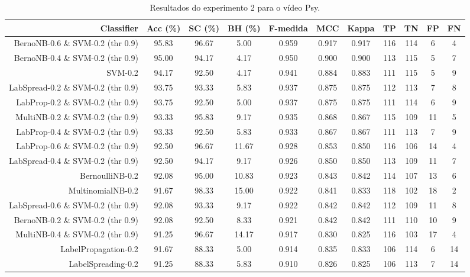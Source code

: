 \begin{table}[!htb]
\centering
\caption{Resultados do experimento 2 para o vídeo Psy.}
\label{tab:Psy}
\begin{tabular}{r|c|c|c|c|c|c|c|c|c|c}
\hline\hline
Classifier & Acc (\%) & SC (\%) & BH (\%) & F-medida & MCC & Kappa & TP & TN & FP & FN \\ \hline
BernoNB-0.6 \& SVM-0.2 (thr 0.9) & 95.83 & 96.67 & 5.00 & 0.959 & 0.917 & 0.917 & 116 & 114 & 6 & 4 \\ 
BernoNB-0.4 \& SVM-0.2 (thr 0.9) & 95.00 & 94.17 & 4.17 & 0.950 & 0.900 & 0.900 & 113 & 115 & 5 & 7 \\ 
SVM-0.2 & 94.17 & 92.50 & 4.17 & 0.941 & 0.884 & 0.883 & 111 & 115 & 5 & 9 \\ 
LabSpread-0.2 \& SVM-0.2 (thr 0.9) & 93.75 & 93.33 & 5.83 & 0.937 & 0.875 & 0.875 & 112 & 113 & 7 & 8 \\ 
LabProp-0.2 \& SVM-0.2 (thr 0.9) & 93.75 & 92.50 & 5.00 & 0.937 & 0.875 & 0.875 & 111 & 114 & 6 & 9 \\ 
MultiNB-0.2 \& SVM-0.2 (thr 0.9) & 93.33 & 95.83 & 9.17 & 0.935 & 0.868 & 0.867 & 115 & 109 & 11 & 5 \\ 
LabProp-0.4 \& SVM-0.2 (thr 0.9) & 93.33 & 92.50 & 5.83 & 0.933 & 0.867 & 0.867 & 111 & 113 & 7 & 9 \\ 
LabProp-0.6 \& SVM-0.2 (thr 0.9) & 92.50 & 96.67 & 11.67 & 0.928 & 0.853 & 0.850 & 116 & 106 & 14 & 4 \\ 
LabSpread-0.4 \& SVM-0.2 (thr 0.9) & 92.50 & 94.17 & 9.17 & 0.926 & 0.850 & 0.850 & 113 & 109 & 11 & 7 \\ 
BernoulliNB-0.2 & 92.08 & 95.00 & 10.83 & 0.923 & 0.843 & 0.842 & 114 & 107 & 13 & 6 \\ 
MultinomialNB-0.2 & 91.67 & 98.33 & 15.00 & 0.922 & 0.841 & 0.833 & 118 & 102 & 18 & 2 \\ 
LabSpread-0.6 \& SVM-0.2 (thr 0.9) & 92.08 & 93.33 & 9.17 & 0.922 & 0.842 & 0.842 & 112 & 109 & 11 & 8 \\ 
BernoNB-0.2 \& SVM-0.2 (thr 0.9) & 92.08 & 92.50 & 8.33 & 0.921 & 0.842 & 0.842 & 111 & 110 & 10 & 9 \\ 
MultiNB-0.4 \& SVM-0.2 (thr 0.9) & 91.25 & 96.67 & 14.17 & 0.917 & 0.830 & 0.825 & 116 & 103 & 17 & 4 \\ 
LabelPropagation-0.2 & 91.67 & 88.33 & 5.00 & 0.914 & 0.835 & 0.833 & 106 & 114 & 6 & 14 \\ 
LabelSpreading-0.2 & 91.25 & 88.33 & 5.83 & 0.910 & 0.826 & 0.825 & 106 & 113 & 7 & 14 \\ 

\end{tabular}
\end{table}
